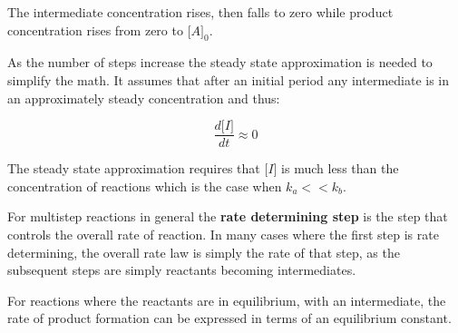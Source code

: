 \documentclass[a4paper, 12 pt]{article}
\newcommand{\conc}[1]{\lbrack #1 \rbrack}
\newcommand{\deriv}[2]{\frac{d #1}{d #2}}
\begin{document}
\begin{flushleft}
The intermediate concentration rises, then falls to zero while product concentration rises from zero to $\conc{A}_0$. 

As the number of steps increase the steady state approximation is needed to simplify the math. It assumes that after an initial period any intermediate is in an approximately steady concentration and thus:

\begin{equation*}
    \deriv{\conc{I}}{t} \approx 0
\end{equation*}

The steady state approximation requires that $\conc{I}$ is much less than the concentration of reactions which is the case when $k_a << k_b$.

For multistep reactions in general the \textbf{rate determining step} is the step that controls the overall rate of reaction. In many cases where the first step is rate determining, the overall rate law is simply the rate of that step, as the subsequent steps are simply reactants becoming intermediates.

For reactions where the reactants are in equilibrium, with an intermediate, the rate of product formation can be expressed in terms of an equilibrium constant.

\end{flushleft}
\end{document}
